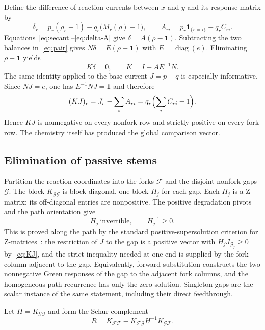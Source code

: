 \documentclass[11pt,reqno]{amsart}
\theoremstyle{plain}
\theoremstyle{definition}
\theoremstyle{remark}
\numberwithin{equation}{section}
\newcommand{\one}{\mathbf{1}}
\newcommand{\diag}{\operatorname{diag}}
\begin{document}
Define the difference of reaction currents between $x$ and $y$ and its response matrix by
\begin{equation}\label{eq:delta-A}
\delta_r=p_r(\rho_r-1)-q_r\bigl(M_r(\rho)-1\bigr),\qquad
A_{ri}=p_r\one_{\{r=i\}}-q_rC_{ri} .
\end{equation}
Equations~\eqref{eq:secant}--\eqref{eq:delta-A} give $\delta=A(\rho-\one)$.  Subtracting the two balances in~\eqref{eq:pair} gives $N\delta=E(\rho-\one)$ with $E=\diag(e)$.  Eliminating $\rho-\one$ yields
\begin{equation}\label{eq:kernel}
K\delta=0,\qquad K=I-AE^{-1}N .
\end{equation}
The same identity applied to the base current $J=p-q$ is especially informative.  Since $NJ=e$, one has $E^{-1}NJ=\one$ and therefore
\begin{equation}\label{eq:KJ}
(KJ)_r=J_r-\sum_iA_{ri}=q_r\Bigl(\sum_iC_{ri}-1\Bigr).
\end{equation}
Hence $KJ$ is nonnegative on every nonfork row and strictly positive on every fork row.  The chemistry itself has produced the global comparison vector.

\subsection{Elimination of passive stems}\label{subsec:gaps}
Partition the reaction coordinates into the forks $\mathcal F$ and the disjoint nonfork gaps $\mathcal G$.  The block $K_{\mathcal G\mathcal G}$ is block diagonal, one block $H_j$ for each gap.  Each $H_j$ is a Z-matrix: its off-diagonal entries are nonpositive.  The positive degradation pivots and the path orientation give
\begin{equation}\label{eq:Hinv}
H_j\ \text{invertible},\qquad H_j^{-1}\ge0 .
\end{equation}
This is proved along the path by the standard positive-supersolution criterion for Z-matrices~\cite{BP94}: the restriction of $J$ to the gap is a positive vector with $H_jJ_{\mathcal G_j}\ge0$ by~\eqref{eq:KJ}, and the strict inequality needed at one end is supplied by the fork column adjacent to the gap.  Equivalently, forward substitution constructs the two nonnegative Green responses of the gap to the adjacent fork columns, and the homogeneous path recurrence has only the zero solution.  Singleton gaps are the scalar instance of the same statement, including their direct feedthrough.

Let $H=K_{\mathcal G\mathcal G}$ and form the Schur complement
\begin{equation}\label{eq:schur}
R=K_{\mathcal F\mathcal F}-K_{\mathcal F\mathcal G}H^{-1}K_{\mathcal G\mathcal F} .
\end{equation}
\end{document}
